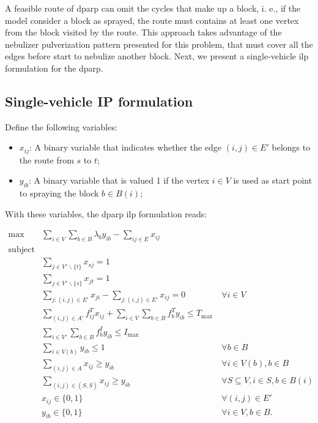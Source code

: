 \documentclass[a4paper,11pt]{article}
\begin{document}
A feasible route of \gls{dparp} can omit the cycles that make up a block, i. e.,
if the model consider  a block as sprayed, the route must  contains at least one
vertex from the block visited by the route. This approach takes advantage of the
nebulizer pulverization pattern presented for  this problem, that must cover all
the  edges  before  start  to  nebulize   another  block.  Next,  we  present  a
single-vehicle \gls{ilp} formulation for the \gls{dparp}.

\newpage
\subsection{Single-vehicle IP formulation}

Define the following variables:

\begin{itemize}
  \item $x_{ij}$: A binary variable that indicates whether the edge $(i, j) \in
    E'$ belongs to the route from $s$ to $t$;
  \item $y_{ib}$: A binary variable that is valued 1 if the vertex $i \in V$ is
    used as start point to spraying the block $b \in B(i)$; 
\end{itemize}
With these variables, the \gls{dparp} \gls{ilp} formulation reads:

\begin{align}
  \max & \sum_{i \in V} \sum_{b \in B} \lambda_b y_{ib} - \sum_{ij \in E} x_{ij} & \label{eq:of}\\
  \nonumber \text{subject to:} & & \\
       & \sum_{j \in V'\backslash \{t\}} x_{sj} = 1 & \label{eq:s-all} \\
       & \sum_{j \in V'\backslash \{s\}} x_{jt} = 1 & \label{eq:all-t} \\
       & \sum_{j: (i, j) \in E'} x_{ji} - \sum_{j: (i, j) \in E'} x_{ij} = 0 & \ \forall i \in V \label{eq:flow-conservation} \\
       & \sum_{(i, j) \in A'} f^T_{ij} x_{ij} + \sum_{i \in V} \sum_{b \in B} f^T_b y_{ib} \leq T_{\max} & \label{eq:max-time} \\
       & \sum_{i \in V'} \sum_{b \in B} f^I_b y_{ib} \leq I_{\max} & \label{eq:max-insecticide} \\
       & \sum_{i \in V(b)} y_{ib} \leq 1 & \ \forall b \in B \label{eq:max-attend} \\
       & \sum_{(i, j) \in A} x_{ij} \geq y_{ib} & \ \forall i \in V(b), b \in B \label{eq:in-path} \\
       & \sum_{(i, j) \in (S, \bar{S})} x_{ij} \geq y_{ib} & \ \forall S \subseteq V, i \in S, b \in B(i) \label{eq:subtour-elimination} \\
       & x_{ij} \in \{0, 1\} & \ \forall (i, j) \in E' \label{eq:dom-x} \\
       & y_{ib} \in \{0, 1\} & \ \forall i \in V, b \in B. \label{eq:dom-y} 
\end{align}
\end{document}
